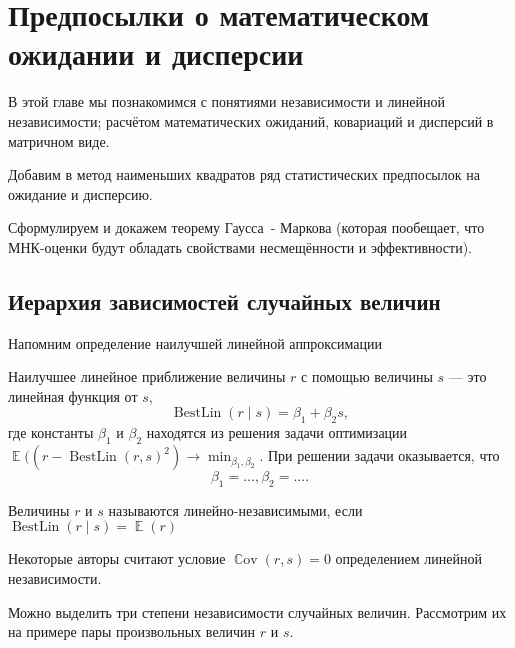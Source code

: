 \documentclass[12pt]{article}
\DeclareMathOperator{\Cov}{\mathbb{C}ov}
\DeclareMathOperator{\BestLin}{BestLin}
\DeclareMathOperator{\E}{\mathbb{E}}
\begin{document}
\section{Предпосылки о математическом ожидании и дисперсии}
В этой главе мы познакомимся с понятиями независимости и линейной независимости; расчётом математических ожиданий, ковариаций и дисперсий в матричном виде.

Добавим в метод наименьших квадратов ряд статистических предпосылок на ожидание и дисперсию.

Сформулируем и докажем теорему Гаусса~- Маркова (которая пообещает, что МНК-оценки будут обладать свойствами несмещённости и эффективности).

\subsection{Иерархия зависимостей случайных величин}


Напомним определение наилучшей линейной аппроксимации
\begin{definition}
Наилучшее линейное приближение величины $r$ с помощью величины $s$ — это линейная функция от $s$,
\[
\BestLin(r \mid s) = \beta_1 + \beta_2 s,
\]
где константы $\beta_1$ и $\beta_2$ находятся из решения задачи оптимизации
$\E((r - \BestLin(r, s)^2) \to \min_{\beta_1, \beta_2}$.
При решении задачи оказывается, что
\[
\beta_1 = ..., \beta_2 = ....
\]
\end{definition}

\begin{definition}
Величины $r$ и $s$ называются линейно-независимыми, если $\BestLin(r \mid s) = \E(r)$
\end{definition}
Некоторые авторы считают условие $\Cov(r, s) = 0$ определением линейной независимости.

Можно выделить три степени независимости случайных величин. 
Рассмотрим их на примере пары произвольных величин $r$ и $s$.
\end{document}
